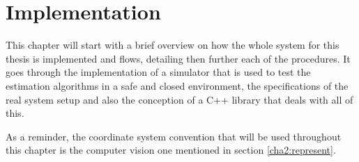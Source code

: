 
\chapter{Implementation}
\label{implementation}

This chapter will start with a brief overview on how the whole system for this thesis is implemented and flows, detailing then further each of the procedures. It goes through the implementation of a simulator that is used to test the estimation algorithms in a safe and closed environment, the specifications of the real system setup and also the conception of a C++ library that deals with all of this.

As a reminder, the coordinate system convention that will be used throughout this chapter is the computer vision one mentioned in section \ref{cha2:represent}. 

